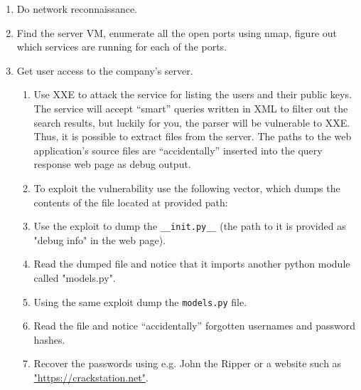 \documentclass[a4paper]{article}
\begin{document}
\begin{enumerate}
  \item Do network reconnaissance.
  \item Find the server VM, enumerate all the open ports using nmap, figure
        out which services are running for each of the ports.
  \item Get user access to the company's server.
        \begin{enumerate}
          \item Use XXE to attack the service for listing the users and their public keys.
            The service will accept ``smart'' queries written in XML to filter out
            the search results, but luckily for you, the parser will be
            vulnerable to XXE. Thus, it is possible to extract files
            from the server. The paths to the web application's source files
            are ``accidentally'' inserted into the query response web page
            as debug output.
          \item To exploit the vulnerability use the following vector, which
            dumps the contents of the file located at provided path:
            
          \item Use the exploit to dump the \texttt{\_\_init.py\_\_}
            (the path to it is provided as "debug info" in the web page).
          \item Read the dumped file and notice that it imports another
            python module called "models.py".
          \item Using the same exploit dump the \texttt{models.py} file.
          \item Read the file and notice ``accidentally'' forgotten usernames
            and password hashes.
          \item Recover the passwords using e.g. John the Ripper or
            a website such as \url{"https://crackstation.net"}.
        \end{enumerate}


\end{enumerate}
\end{document}
